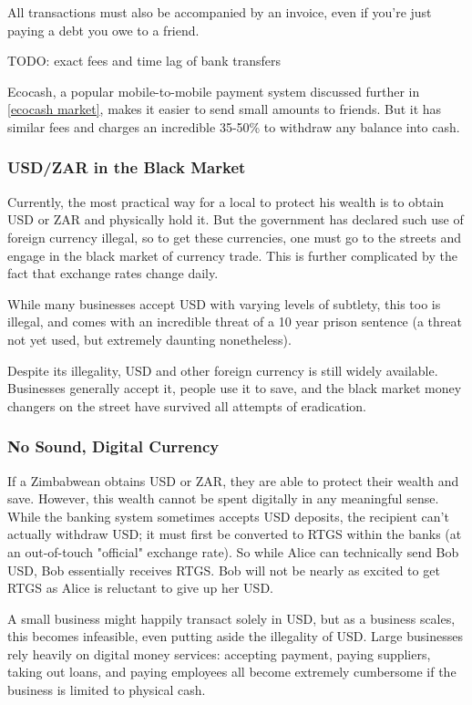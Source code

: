 \documentclass{article}
\begin{document}
All transactions must also be accompanied by an invoice, even if you're just paying a debt you owe to a friend.

TODO: exact fees and time lag of bank transfers

Ecocash, a popular mobile-to-mobile payment system discussed further in \ref{ecocash market}, makes it easier to send small amounts to friends. But it has similar fees and charges an incredible 35-50\% to withdraw any balance into cash.

\subsubsection{USD/ZAR in the Black Market} \label{usd}

Currently, the most practical way for a local to protect his wealth is to obtain USD or ZAR and physically hold it. But the government has declared such use of foreign currency illegal, so to get these currencies, one must go to the streets and engage in the black market of currency trade. This is further complicated by the fact that exchange rates change daily.

While many businesses accept USD with varying levels of subtlety, this too is illegal, and comes with an incredible threat of a 10 year prison sentence (a threat not yet used, but extremely daunting nonetheless).

Despite its illegality, USD and other foreign currency is still widely available. Businesses generally accept it, people use it to save, and the black market money changers on the street have survived all attempts of eradication.

\subsubsection{No Sound, Digital Currency} \label{gap}

If a Zimbabwean obtains USD or ZAR, they are able to protect their wealth and save. However, this wealth cannot be spent digitally in any meaningful sense. While the banking system sometimes accepts USD deposits, the recipient can't actually withdraw USD; it must first be converted to RTGS within the banks (at an out-of-touch "official" exchange rate). So while Alice can technically send Bob USD, Bob essentially receives RTGS. Bob will not be nearly as excited to get RTGS as Alice is reluctant to give up her USD.

A small business might happily transact solely in USD, but as a business scales, this becomes infeasible, even putting aside the illegality of USD. Large businesses rely heavily on digital money services: accepting payment, paying suppliers, taking out loans, and paying employees all become extremely cumbersome if the business is limited to physical cash.
\end{document}
